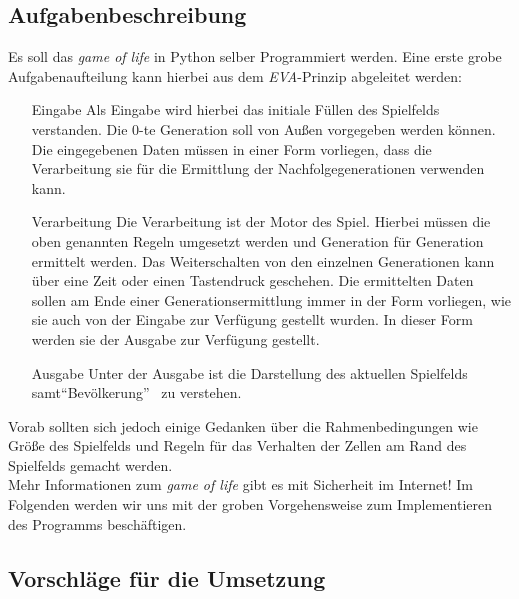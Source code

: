 \subsection{Aufgabenbeschreibung}
Es soll das \textit{game of life} in Python selber Programmiert werden. Eine erste grobe Aufgabenaufteilung kann hierbei aus dem \textit{EVA}-Prinzip abgeleitet werden:
\begin{itemize}
	\item[Eingabe] Als Eingabe wird hierbei das initiale Füllen des Spielfelds verstanden. Die 0-te Generation soll von Außen vorgegeben werden können. Die eingegebenen Daten müssen in einer Form vorliegen, dass die Verarbeitung sie für die Ermittlung der Nachfolgegenerationen verwenden kann.
	\item[Verarbeitung] Die Verarbeitung ist der Motor des Spiel. Hierbei müssen die oben genannten Regeln umgesetzt werden und Generation für Generation ermittelt werden. Das Weiterschalten von den einzelnen Generationen kann über eine Zeit oder einen Tastendruck geschehen. Die ermittelten Daten sollen am Ende einer Generationsermittlung immer in der Form vorliegen, wie sie auch von der Eingabe zur Verfügung gestellt wurden. In dieser Form werden sie der Ausgabe zur Verfügung gestellt.
	\item[Ausgabe] Unter der Ausgabe ist die Darstellung des aktuellen Spielfelds samt\textquotedblleft Bevölkerung\textquotedblright~ zu verstehen.
\end{itemize}

Vorab sollten sich jedoch einige Gedanken über die Rahmenbedingungen wie Größe des Spielfelds und Regeln für das Verhalten der Zellen am Rand des Spielfelds gemacht werden.\\
Mehr Informationen zum \textit{game of life} gibt es mit Sicherheit im Internet! Im Folgenden werden wir uns mit der groben Vorgehensweise zum Implementieren des Programms beschäftigen.

\subsection{Vorschläge für die Umsetzung}
